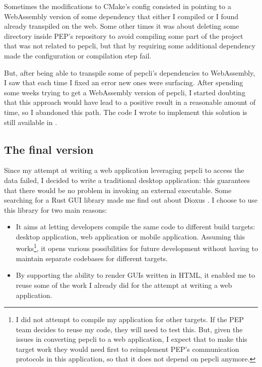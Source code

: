 \documentclass{report}
\begin{document}
Sometimes the modifications to CMake's config consisted in pointing to a WebAssembly version of some dependency that either I compiled or I found already transpiled on the web.
Some other times it was about deleting some directory inside PEP's repository to avoid compiling some part of the project that was not related to pepcli, but that by requiring some
additional dependency made the configuration or compilation step fail. \par
But, after being able to transpile some of pepcli's dependencies to WebAssembly, I saw that each time I fixed an error new ones were surfacing. After spending some weeks trying to
get a WebAssembly version of pepcli, I started doubting that this approach would have lead to a positive result in a reasonable amount of time, so I abandoned this path. The code I
wrote to implement this solution  is still available in \cite{old_branch}. 

\subsection{The final version}
Since my attempt at writing a web application leveraging pepcli to access the data failed, I decided to write a traditional desktop application: this guarantees that there would be
no problem in invoking an external executable. Some searching for a Rust GUI library made me find out about Dioxus \cite{dioxus}. I choose to use this library for two main reasons:

\begin{itemize}
\item It aims at letting developers compile the same code to different build targets: desktop application, web application or mobile application. Assuming this works\footnote{I did
		not attempt to compile my application for other targets. If the PEP team decides to reuse my code, they will need to test this. But, given the issues in converting pepcli
to a web application, I expect that to make this target work they would need first to reimplement PEP's communication protocols in this application, so that it does not depend on
pepcli anymore.}, it opens various possibilities for future
		development without having to maintain separate codebases for different targets.
\item By supporting the ability to render GUIs written in HTML, it enabled me to reuse some of the work I already did for the attempt at writing a web application.
\end{itemize}
\end{document}
